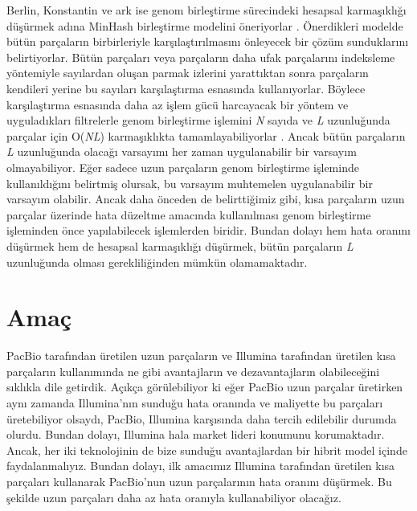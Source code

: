 Berlin, Konstantin ve ark ise genom birleştirme sürecindeki hesapsal karmaşıklığı düşürmek adına MinHash birleştirme modelini öneriyorlar \cite{berlin}. Önerdikleri modelde bütün parçaların birbirleriyle karşılaştırılmasını önleyecek bir çözüm sunduklarını belirtiyorlar. Bütün parçaları veya parçaların daha ufak parçalarını indeksleme yöntemiyle sayılardan oluşan parmak izlerini yarattıktan sonra parçaların kendileri yerine bu sayıları karşılaştırma esnasında kullanıyorlar. Böylece karşılaştırma esnasında daha az işlem gücü harcayacak bir yöntem ve uyguladıkları filtrelerle genom birleştirme işlemini \textit{N} sayıda ve \textit{L} uzunluğunda parçalar için O(\textit{N}\textit{L}) karmaşıklıkta tamamlayabiliyorlar \cite{berlin}. Ancak bütün parçaların \textit{L} uzunluğunda olacağı varsayımı her zaman uygulanabilir bir varsayım olmayabiliyor. Eğer sadece uzun parçaların genom birleştirme işleminde kullanıldığını belirtmiş olursak, bu varsayım muhtemelen uygulanabilir bir varsayım olabilir. Ancak daha önceden de belirttiğimiz gibi, kısa parçaların uzun parçalar üzerinde hata düzeltme amacında kullanılması genom birleştirme işleminden önce yapılabilecek işlemlerden biridir. Bundan dolayı hem hata oranını düşürmek hem de hesapsal karmaşıklığı düşürmek, bütün parçaların \textit{L} uzunluğunda olması gerekliliğinden mümkün olamamaktadır.

\section{Amaç}

PacBio tarafından üretilen uzun parçaların ve Illumina tarafından üretilen kısa parçaların kullanımında ne gibi avantajların ve dezavantajların olabileceğini sıklıkla dile getirdik. Açıkça görülebiliyor ki eğer PacBio uzun parçalar üretirken aynı zamanda Illumina'nın sunduğu hata oranında ve maliyette bu parçaları üretebiliyor olsaydı, PacBio, Illumina karşısında daha tercih edilebilir durumda olurdu. Bundan dolayı, Illumina hala market lideri konumunu korumaktadır. Ancak, her iki teknolojinin de bize sunduğu avantajlardan bir hibrit model içinde faydalanmalıyız. Bundan dolayı, ilk amacımız Illumina tarafından üretilen kısa parçaları kullanarak PacBio'nun uzun parçalarının hata oranını düşürmek. Bu şekilde uzun parçaları daha az hata oranıyla kullanabiliyor olacağız.


